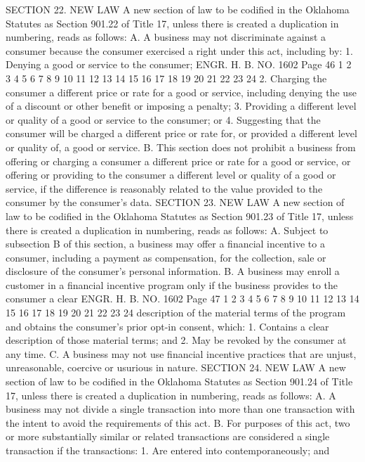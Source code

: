 SECTION 22. NEW LAW A new section of law to be codified
in the Oklahoma Statutes as Section 901.22 of Title 17, unless there
is created a duplication in numbering, reads as follows:
A. A business may not discriminate against a consumer because
the consumer exercised a right under this act, including by:
1. Denying a good or service to the consumer;
ENGR. H. B. NO. 1602 Page 46
1
2
3
4
5
6
7
8
9
10
11
12
13
14
15
16
17
18
19
20
21
22
23
24
2. Charging the consumer a different price or rate for a good
or service, including denying the use of a discount or other benefit
or imposing a penalty;
3. Providing a different level or quality of a good or service
to the consumer; or
4. Suggesting that the consumer will be charged a different
price or rate for, or provided a different level or quality of, a
good or service.
B. This section does not prohibit a business from offering or
charging a consumer a different price or rate for a good or service,
or offering or providing to the consumer a different level or
quality of a good or service, if the difference is reasonably
related to the value provided to the consumer by the consumer's
data.
SECTION 23. NEW LAW A new section of law to be codified
in the Oklahoma Statutes as Section 901.23 of Title 17, unless there
is created a duplication in numbering, reads as follows:
A. Subject to subsection B of this section, a business may
offer a financial incentive to a consumer, including a payment as
compensation, for the collection, sale or disclosure of the
consumer's personal information.
B. A business may enroll a customer in a financial incentive
program only if the business provides to the consumer a clear 
ENGR. H. B. NO. 1602 Page 47
1
2
3
4
5
6
7
8
9
10
11
12
13
14
15
16
17
18
19
20
21
22
23
24
description of the material terms of the program and obtains the
consumer's prior opt-in consent, which:
1. Contains a clear description of those material terms; and
2. May be revoked by the consumer at any time.
C. A business may not use financial incentive practices that
are unjust, unreasonable, coercive or usurious in nature.
SECTION 24. NEW LAW A new section of law to be codified
in the Oklahoma Statutes as Section 901.24 of Title 17, unless there
is created a duplication in numbering, reads as follows:
A. A business may not divide a single transaction into more
than one transaction with the intent to avoid the requirements of
this act.
B. For purposes of this act, two or more substantially similar
or related transactions are considered a single transaction if the
transactions:
1. Are entered into contemporaneously; and

